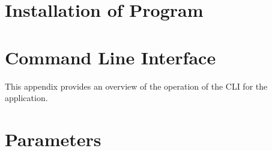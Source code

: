 \documentclass[journal]{IEEEtran}
\begin{document}
\appendices

\section{Installation of Program}
\label{appendix:installation}

\section{Command Line Interface}
\label{appendix:cli}
This appendix provides an overview of the operation of the CLI for the application.

\section{Parameters}
\label{appendix:parameters}

%
%


\ifCLASSOPTIONcaptionsoff
  \newpage
\fi





%
%
%


%
%
\end{document}
